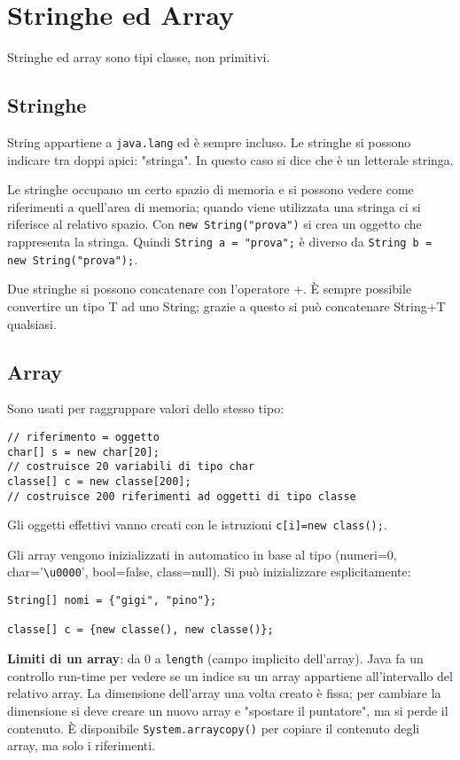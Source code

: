\section{Stringhe ed Array}
Stringhe ed array sono tipi classe, non primitivi.

\subsection{Stringhe}
String appartiene a \texttt{java.lang} ed è sempre incluso. 
Le stringhe si possono indicare tra doppi apici: "stringa". In questo caso si dice che è un letterale stringa.

Le stringhe occupano un certo spazio di memoria e si possono vedere come riferimenti a quell'area di memoria; quando viene utilizzata una stringa ci si riferisce al relativo spazio.
Con \texttt{new String("prova")} si crea un oggetto che rappresenta la stringa.
Quindi \texttt{String a = "prova";} è diverso da \texttt{String b = new String("prova");}.

Due stringhe si possono concatenare con l'operatore +. È sempre possibile convertire un tipo T ad uno String; grazie a questo si può concatenare String+T qualsiasi.

\subsection{Array}
Sono usati per raggruppare valori dello stesso tipo:
\begin{lstlisting}
// riferimento = oggetto
char[] s = new char[20];
// costruisce 20 variabili di tipo char
classe[] c = new classe[200];
// costruisce 200 riferimenti ad oggetti di tipo classe
\end{lstlisting}
Gli oggetti effettivi vanno creati con le istruzioni \texttt{c[i]=new class();}.

Gli array vengono inizializzati in automatico in base al tipo (numeri=0, char='\texttt{\textbackslash{}u0000}', bool=false, class=null).
Si può inizializzare esplicitamente:
\begin{lstlisting}
String[] nomi = {"gigi", "pino"};

classe[] c = {new classe(), new classe()};
\end{lstlisting}
\textbf{Limiti di un array}: da 0 a \texttt{length} (campo implicito dell'array). Java fa un controllo run-time per vedere se un indice su un array appartiene all'intervallo del relativo array. La dimensione dell'array una volta creato è fissa; per cambiare la dimensione si deve creare un nuovo array e "spostare il puntatore", ma si perde il contenuto. È disponibile \texttt{System.arraycopy()} per copiare il contenuto degli array, ma solo i riferimenti.

